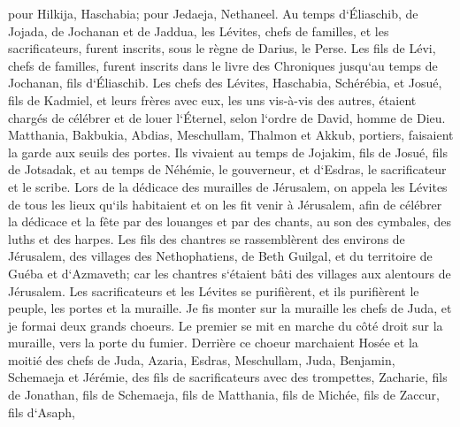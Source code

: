 \verse pour Hilkija, Haschabia; pour Jedaeja, Nethaneel. 
\verse Au temps d`Éliaschib, de Jojada, de Jochanan et de Jaddua, les Lévites, chefs de familles, et les sacrificateurs, furent inscrits, sous le règne de Darius, le Perse. 
\verse Les fils de Lévi, chefs de familles, furent inscrits dans le livre des Chroniques jusqu`au temps de Jochanan, fils d`Éliaschib. 
\verse Les chefs des Lévites, Haschabia, Schérébia, et Josué, fils de Kadmiel, et leurs frères avec eux, les uns vis-à-vis des autres, étaient chargés de célébrer et de louer l`Éternel, selon l`ordre de David, homme de Dieu. 
\verse Matthania, Bakbukia, Abdias, Meschullam, Thalmon et Akkub, portiers, faisaient la garde aux seuils des portes. 
\verse Ils vivaient au temps de Jojakim, fils de Josué, fils de Jotsadak, et au temps de Néhémie, le gouverneur, et d`Esdras, le sacrificateur et le scribe. 
\verse Lors de la dédicace des murailles de Jérusalem, on appela les Lévites de tous les lieux qu`ils habitaient et on les fit venir à Jérusalem, afin de célébrer la dédicace et la fête par des louanges et par des chants, au son des cymbales, des luths et des harpes. 
\verse Les fils des chantres se rassemblèrent des environs de Jérusalem, des villages des Nethophatiens, 
\verse de Beth Guilgal, et du territoire de Guéba et d`Azmaveth; car les chantres s`étaient bâti des villages aux alentours de Jérusalem. 
\verse Les sacrificateurs et les Lévites se purifièrent, et ils purifièrent le peuple, les portes et la muraille. 
\verse Je fis monter sur la muraille les chefs de Juda, et je formai deux grands choeurs. Le premier se mit en marche du côté droit sur la muraille, vers la porte du fumier. 
\verse Derrière ce choeur marchaient Hosée et la moitié des chefs de Juda, 
\verse Azaria, Esdras, Meschullam, 
\verse Juda, Benjamin, Schemaeja et Jérémie, 
\verse des fils de sacrificateurs avec des trompettes, Zacharie, fils de Jonathan, fils de Schemaeja, fils de Matthania, fils de Michée, fils de Zaccur, fils d`Asaph, 
